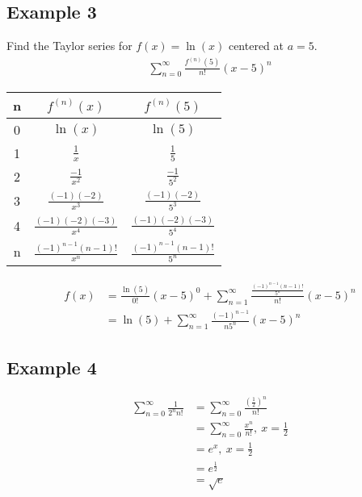 \documentclass{article}
\theoremstyle{mytheoremstyle}
\theoremstyle{mytheoremstyle}
\theoremstyle{myproblemstyle}
\begin{document}
    \subsection*{Example 3}
    Find the Taylor series for $f(x)=\ln(x)$ centered at $a=5$.
    \begin{align*}
        \sum_{n=0}^{\infty} \frac{f^{(n)}(5)}{n!} (x-5)^n
    \end{align*}

    \begin{center}
    \renewcommand{\arraystretch}{2}
    \begin{tabular}[c]{c|c|c}
        n & $f^{(n)}(x)$ & $f^{(n)}(5)$ \\
        \hline
        0 & $\ln(x)$ & $\ln(5)$ \\
        1 & $\frac{1}{x}$ & $\frac{1}{5}$ \\
        2 & $\frac{-1}{x^2}$ & $\frac{-1}{5^2}$ \\
        3 & $\frac{(-1)(-2)}{x^3}$ & $\frac{(-1)(-2)}{5^3}$ \\
        4 & $\frac{(-1)(-2)(-3)}{x^4}$ & $\frac{(-1)(-2)(-3)}{5^4}$ \\
        n & $\frac{(-1)^{n-1}(n-1)!}{x^n}$ & $\frac{(-1)^{n-1}(n-1)!}{5^n}$ \\
    \end{tabular}
    \end{center}

    \begin{align*}
        f(x) &= \frac{\ln(5)}{0!}(x-5)^0 + \sum_{n=1}^{\infty} \frac{\frac{(-1)^{n-1}(n-1)!}{5^n}}{n!} (x-5)^n \\
             &= \ln(5) + \sum_{n=1}^{\infty} \frac{(-1)^{n-1}}{n5^n} (x-5)^n
    \end{align*}

    \subsection*{Example 4}
    \begin{align*}
        \sum_{n=0}^{\infty} \frac{1}{2^n n!}
        &= \sum_{n=0}^{\infty} \frac{(\frac{1}{2})^n}{n!} \\
        &= \sum_{n=0}^{\infty} \frac{x^n}{n!},\ x = \frac{1}{2} \\
        &= e^x,\ x = \frac{1}{2} \\
        &= e^{\frac{1}{2}} \\
        &= \sqrt{e}
    \end{align*}
\end{document}
